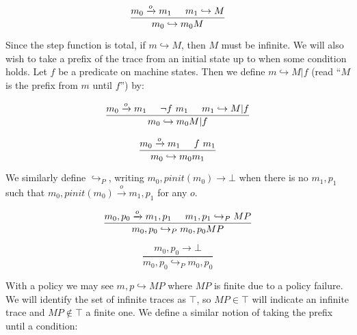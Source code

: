 \documentclass{article}
\begin{document}
    \[\frac{m_0 \xrightarrow{o} m_1 \hspace{.5cm} m_1 \hookrightarrow M}
           {m_0 \hookrightarrow m_0 M}\]

    Since the step function is total, if \(m \hookrightarrow M\), then \(M\) must be infinite.
    We will also wish to take a prefix of the trace from an initial state up to when some condition
    holds. Let \(f\) be a predicate on machine states. Then we define \(m \hookrightarrow M | f\)
    (read ``\(M\) is the prefix from \(m\) until \(f\)'') by:

    \begin{minipage}[b]{.45\textwidth}
      \[\frac{m_0 \xrightarrow{o} m_1 \hspace{.5cm} \neg f\ m_1 \hspace{.5cm} m_1 \hookrightarrow M | f }
             {m_0 \hookrightarrow m_0 M | f}\]
    \end{minipage}
    \begin{minipage}[b]{.45\textwidth}
      \[\frac{m_0 \xrightarrow{o} m_1 \hspace{.5cm} f\ m_1}
             {m_0 \hookrightarrow m_0 m_1}\]
    \end{minipage}
    \vspace{\belowdisplayskip}

    We similarly define \(\hookrightarrow_P\), writing \(m_0,\mathit{pinit}(m_0) \longrightarrow \bot\) when
    there is no \(m_1,p_1\) such that \(m_0,\mathit{pinit}(m_0) \xrightarrow{o} m_1,p_1\) for any \(o\).
    
    \begin{minipage}[b]{.45\textwidth}
      \[\frac{m_0,p_0 \xrightarrow{o} m_1,p_1 \hspace{.5cm} m_1,p_1 \hookrightarrow_P MP}
             {m_0,p_0 \hookrightarrow_P m_0,p_0 MP}\]
    \end{minipage}
    \begin{minipage}[b]{.45\textwidth}
      \[\frac{m_0,p_0 \longrightarrow \bot}
             {m_0,p_0 \hookrightarrow_P m_0,p_0}\]
    \end{minipage}
    \vspace{\belowdisplayskip}

    With a policy we may see \(m,p \hookrightarrow MP\) where \(MP\) is finite due to a policy
    failure. We will identify the set of infinite traces as \(\top\), so \(MP \in \top\) will
    indicate an infinite trace and \(MP \not \in \top\) a finite one.
    We define a similar notion of taking the prefix until a condition:
\end{document}
